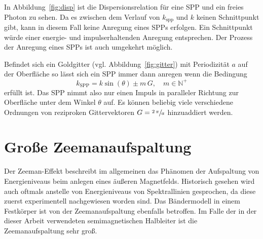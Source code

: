 In Abbildung~\ref{fig:disp} ist die Dispersionsrelation für eine SPP und ein freies Photon zu sehen. 
Da es zwischen dem Verlauf von $k_\text{spp}$ und $k$ keinen Schnittpunkt gibt, kann
in diesem Fall keine Anregung eines SPPs erfolgen. 
Ein Schnittpunkt würde  einer energie- und impulserhaltenden Anregung entsprechen.
Der Prozess der Anregung eines SPPs ist auch umgekehrt möglich.

Befindet sich ein Goldgitter (vgl. Abbildung~\ref{fig:gitter}) 
mit Periodizität $a$ auf der Oberfläche so lässt sich 
ein SPP immer dann anregen wenn die Bedingung
\begin{equation}
    k_\text{SPP} = k \sin(\theta) \pm m \, G, \quad  m \in \mathbb{N}^+
\end{equation}
erfüllt ist.
Das SPP nimmt also nur einen Impuls in paralleler Richtung zur Oberfläche unter dem Winkel $\theta$ auf.
Es können beliebig viele verschiedene Ordnungen von
reziproken Gittervektoren $G = \sfrac{2 \, \pi}{a}$ hinzuaddiert werden.

\section{Große Zeemanaufspaltung}\label{sec:Große Zeemanaufspaltung}
Der Zeeman-Effekt beschreibt im allgemeinen das Phänomen der Aufspaltung von 
Energieniveaus beim anlegen eines äußeren Magnetfelds. 
Historisch gesehen wird auch oftmals anstelle von Energieniveaus von Spektrallinien gesprochen, 
da diese zuerst experimentell nachgewiesen worden sind.
Das Bändermodell in einem Festkörper ist von der Zeemanaufspaltung ebenfalls betroffen.
Im Falle der in der dieser Arbeit verwendeten semimagnetischen Halbleiter ist die Zeemanaufspaltung
sehr groß.\cite{zeeman}

